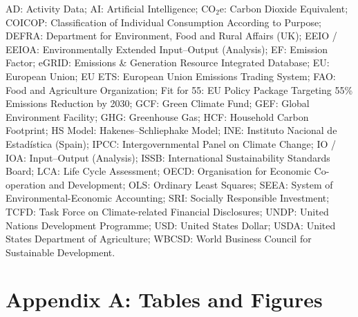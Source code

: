 \documentclass[12pt,a4paper]{article}%
\begin{document}
AD: Activity Data; AI: Artificial Intelligence; CO$_2$e: Carbon Dioxide Equivalent; COICOP: Classification of Individual Consumption According to Purpose; DEFRA: Department for Environment, Food and Rural Affairs (UK); EEIO / EEIOA: Environmentally Extended Input--Output (Analysis); EF: Emission Factor; eGRID: Emissions \& Generation Resource Integrated Database; EU: European Union; EU ETS: European Union Emissions Trading System; FAO: Food and Agriculture Organization; Fit for 55: EU Policy Package Targeting 55\% Emissions Reduction by 2030; GCF: Green Climate Fund; GEF: Global Environment Facility; GHG: Greenhouse Gas; HCF: Household Carbon Footprint; HS Model: Hakenes--Schliephake Model; INE: Instituto Nacional de Estadística (Spain); IPCC: Intergovernmental Panel on Climate Change; IO / IOA: Input--Output (Analysis); ISSB: International Sustainability Standards Board; LCA: Life Cycle Assessment; OECD: Organisation for Economic Co-operation and Development; OLS: Ordinary Least Squares; SEEA: System of Environmental-Economic Accounting; SRI: Socially Responsible Investment; TCFD: Task Force on Climate-related Financial Disclosures; UNDP: United Nations Development Programme; USD: United States Dollar; USDA: United States Department of Agriculture; WBCSD: World Business Council for Sustainable Development.


\appendix
\section*{Appendix A: Tables and Figures}

\renewcommand{\thetable}{A\arabic{table}}
\renewcommand{\thefigure}{A\arabic{figure}}
\setcounter{table}{0}
\setcounter{figure}{0}
\end{document}
